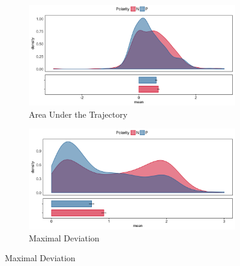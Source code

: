 \documentclass[draft]{article}
\begin{document}
\begin{figure}
\centering
\begin{subfigure}[b]{0.4\textwidth}
\includegraphics[width=\textwidth]{AUC_negation.png}
\caption{Area Under the Trajectory}
\end{subfigure}
%
\begin{subfigure}[b]{0.4\textwidth}
\includegraphics[width=\textwidth]{MD_negation.png}
\caption{Maximal Deviation}
\end{subfigure}


\end{figure}
\end{document}

